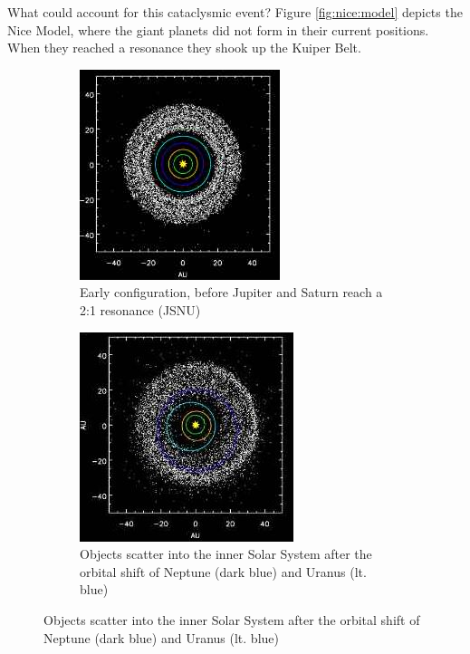 \documentclass[]{article}
\begin{document}
What could account for this cataclysmic event? Figure \ref{fig:nice:model} depicts the Nice Model, where the giant planets did not form in their current positions. When they reached a resonance they shook up the Kuiper Belt.

\begin{figure}[H]
	\caption{The Nice Model}\label{fig:nice:model}
	\begin{subfigure}[b]{0.3\textwidth}
		\caption{Early configuration, before Jupiter and Saturn reach a 2:1 resonance (JSNU)}
		\includegraphics[width=\textwidth]{Nice1}
	\end{subfigure}
	\begin{subfigure}[b]{0.3\textwidth}
		\caption{Objects scatter into the inner Solar System after the orbital shift of Neptune (dark blue) and Uranus (lt. blue)}
		\includegraphics[width=\textwidth]{Nice2}

\end{subfigure}
\end{figure}
\end{document}
